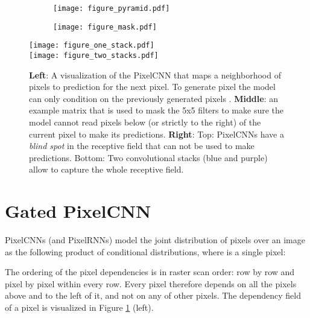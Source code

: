 \documentclass{article}
\begin{document}
\begin{figure}[t]
  \centering
  \begin{subfigure}{.37\textwidth}
    \centering
    \texttt{[image: figure\_pyramid.pdf]}
  \end{subfigure}\hfill
  \begin{subfigure}{.25\textwidth}
    \centering 
    \texttt{[image: figure\_mask.pdf]}
  \end{subfigure}\hfill
  \begin{minipage}[h]{0.3\textwidth}
  \hspace*{7.5pt}
  \texttt{[image: figure\_one\_stack.pdf]}
  \\
  \texttt{[image: figure\_two\_stacks.pdf]}
  \end{minipage}

  \vspace{6pt}

  \caption{\textbf{Left}: A visualization of the PixelCNN that maps a neighborhood of pixels to prediction for the next pixel. To generate pixel  the model can only condition on the previously generated pixels . \textbf{Middle}: an example matrix that is used to mask the 5x5 filters to make sure the model cannot read pixels below (or strictly to the right) of the current pixel to make its predictions. \textbf{Right}: Top: PixelCNNs have a \emph{blind spot} in the receptive field that can not be used to make predictions. Bottom: Two convolutional stacks (blue and purple) allow to capture the whole receptive field.}
  \label{fig:explain_pixelcnn}
\end{figure}
 \section{Gated PixelCNN}

PixelCNNs (and PixelRNNs) \cite{van2016pixel} model the joint distribution of pixels over an image  as the following product of conditional distributions, where  is a single pixel: 

The ordering of the pixel dependencies is in raster scan order: row by row and pixel by pixel within every row. Every pixel therefore depends on all the pixels above and to the left of it, and not on any of other pixels. The dependency field of a pixel is visualized in Figure \ref{fig:explain_pixelcnn} (left). 
 
\end{document}
